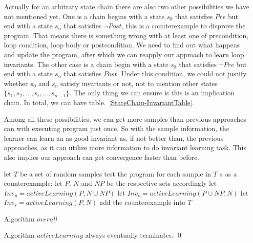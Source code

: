 Actually for an arbitrary state chain there are also two other possibilities we have not mentioned yet.
One is a chain begins with a state $s_0$ that satisfies $Pre$ but end with a state $s_n$ that satisfies $\neg Post$,
this is a counterexample to disprove the program.
That means there is something wrong with at least one of precondition, loop condition, loop body or postcondition.
We need to find out what happens and update the program, 
after which we can reapply our approach to learn loop invariants.
The other case is a chain begin with a state $s_0$ that satisfies $\neg Pre$ but end with a state $s_n$ that satisfies $Post$.
Under this condition, we could not justify whether $s_0$ and $s_n$ satisfy invariants or not,
not to mention other states $\{s_1, s_2, ..., s_i, ... , s_{n-1}\}$.
The only thing we can ensure is this is an implication chain.
In total, we can have table.~\ref{StateChain-InvariantTable}.




Among all these possibilities,
we can get more samples than previous approaches can with executing program just once.
So with the sample information, 
the learner can learn an as good invariant as, if not better than, the previous approaches, 
as it can utilize more information to do invariant learning task.
This also implies our approach can get convergence faster than before.









\begin{algorithm}[t]
\SetAlgoVlined
\Indm
{}
\Indp
let $T$ be a set of random samples\;
 {
    test the program for each sample in $T$\;
     {
        \Return $s$ as a counterexample;
    }
    let $P$, $N$ and $NP$ be the respective sets accordingly\;
    let $Inv_u = activeLearning(P, N \cup NP)$\;
    let $Inv_o = activeLearning(P \cup NP, N)$\;
    let $Inv_s = activeLearning(P, N)$\;
     {
         {
            add the counterexample into $T$\;
        }
    }
}
\caption{Algorithm $overall$}
\label{alg:overall}
\end{algorithm}

\begin{example}
\end{example}

\begin{proposition}
Algorithm $activeLearning$ always eventually terminates. \hfill \qed
\end{proposition}


\begin{example}
\end{example}

